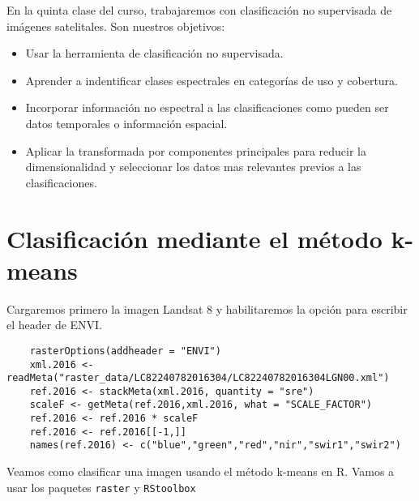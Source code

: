 En la quinta clase del curso, trabajaremos con clasificaci\'on no supervisada
de im\'agenes satelitales. Son nuestros objetivos:

\begin{itemize}
  \item Usar la herramienta de clasificaci\'on no supervisada.
  \item Aprender a indentificar clases espectrales en categor\'ias de uso y cobertura.
  \item Incorporar informaci\'on no espectral a las clasificaciones como
  pueden ser datos temporales o informaci\'on espacial.
  \item Aplicar la transformada por componentes principales para reducir la dimensionalidad
  y seleccionar los datos mas relevantes previos a las clasificaciones.
\end{itemize}

\section{Clasificaci\'on mediante el m\'etodo k-means}

Cargaremos primero la imagen Landsat 8 y habilitaremos la opci\'on para escribir
el header de ENVI\@.

\begin{lstlisting}
    rasterOptions(addheader = "ENVI")
    xml.2016 <- readMeta("raster_data/LC82240782016304/LC82240782016304LGN00.xml")
    ref.2016 <- stackMeta(xml.2016, quantity = "sre")
    scaleF <- getMeta(ref.2016,xml.2016, what = "SCALE_FACTOR")
    ref.2016 <- ref.2016 * scaleF
    ref.2016 <- ref.2016[[-1,]]
    names(ref.2016) <- c("blue","green","red","nir","swir1","swir2")
\end{lstlisting}

Veamos como clasificar una imagen usando el m\'etodo k-means en R. Vamos a usar
los paquetes \texttt{raster} y \texttt{RStoolbox}

